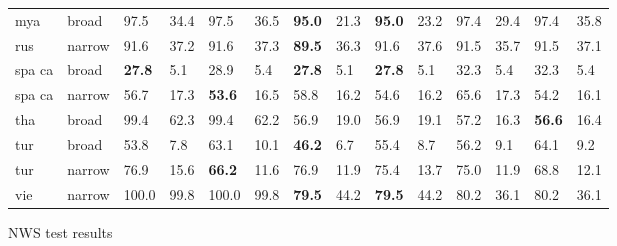 \begin{center}
{\begin{tabularx}{1.2\textwidth}{|Xl||ll||ll||ll||ll||ll||ll|}
mya                & broad         & 97.5               & 34.4             & 97.5               & 36.5              & \textbf{95.0}       & 21.3              & \textbf{95.0}       & 23.2               & 97.4              & 29.4             & 97.4               & 35.8             \\
rus                & narrow        & 91.6               & 37.2             & 91.6               & 37.3              & \textbf{89.5}       & 36.3              & 91.6                & 37.6               & 91.5              & 35.7             & 91.5               & 37.1             \\
spa ca             & broad         & \textbf{27.8}      & 5.1              & 28.9               & 5.4               & \textbf{27.8}       & 5.1               & \textbf{27.8}       & 5.1                & 32.3              & 5.4              & 32.3               & 5.4              \\
spa ca             & narrow        & 56.7               & 17.3             & \textbf{53.6}      & 16.5              & 58.8                & 16.2              & 54.6                & 16.2               & 65.6              & 17.3             & 54.2               & 16.1             \\
tha                & broad         & 99.4               & 62.3             & 99.4               & 62.2              & 56.9                & 19.0              & 56.9                & 19.1               & 57.2              & 16.3             & \textbf{56.6}      & 16.4             \\
tur                & broad         & 53.8               & 7.8              & 63.1               & 10.1              & \textbf{46.2}       & 6.7               & 55.4                & 8.7                & 56.2              & 9.1              & 64.1               & 9.2              \\
tur                & narrow        & 76.9               & 15.6             & \textbf{66.2}      & 11.6              & 76.9                & 11.9              & 75.4                & 13.7               & 75.0              & 11.9             & 68.8               & 12.1             \\
vie                & narrow        & 100.0              & 99.8             & 100.0              & 99.8              & \textbf{79.5}       & 44.2              & \textbf{79.5}       & 44.2               & 80.2              & 36.1             & 80.2               & 36.1  \\
\hline   

\end{tabularx}
}{NWS test results} 

\end{center}  


